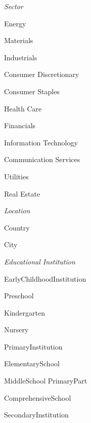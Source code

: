 \documentclass[english]{article}
\begin{document}
\begin{labelist}
\begin{labelist}
        \end{labelist}
    \item 
        \textit{Sector} \cite{sector_ref}
        \begin{labelist}
            \item Energy
            \item Materials
            \item Industrials
            \item Consumer Discretionary
            \item Consumer Staples
            \item Health Care
            \item Financials
            \item Information Technology
            \item Communication Services
            \item Utilities
            \item Real Estate
        \end{labelist}
    \item  
        \textit{Location}
        \begin{labelist}
            \item Country
            \item City
    \item 
        \textit{Educational Institution} \cite{educational_institution_ref}
        \begin{labelist}
            \item EarlyChildhoodInstitution
                \begin{labelist}
                    \item Preschool
                    \item Kindergarten
                    \item Nursery
                \end{labelist}
            \item PrimaryInstitution
                \begin{labelist}
                    \item ElementarySchool
                    \item MiddleSchool PrimaryPart
                    \item ComprehensiveSchool
                \end{labelist}
            \item SecondaryInstitution
                \begin{labelist}

\end{labelist}
\end{labelist}
\end{labelist}
\end{labelist}
\end{document}
